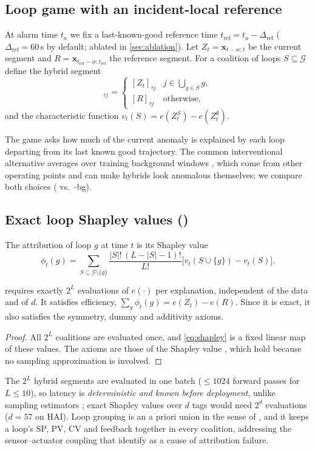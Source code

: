 \subsection{Loop game with an incident-local reference}
At alarm time $t_a$ we fix a last-known-good reference time $t_{\mathrm{ref}}=t_a-\Delta_{\mathrm{ref}}$ ($\Delta_{\mathrm{ref}}=60$\,s by default; ablated in \cref{sec:ablation}). Let $Z_t=\bm x_{t-w:t}$ be the current segment and $R=\bm x_{t_{\mathrm{ref}}-w:t_{\mathrm{ref}}}$ the reference segment. For a coalition of loops $S\subseteq\mathcal G$ define the hybrid segment
\begin{equation}
[Z_t^S]_{\tau j}=\begin{cases}[Z_t]_{\tau j}& j\in\bigcup_{g\in S}g,\\ [R]_{\tau j}&\text{otherwise,}\end{cases}
\end{equation}
and the characteristic function $v_t(S)=e(Z^S_t)-e(Z^\emptyset_t)$.

The game asks how much of the current anomaly is explained by each loop departing from its last known good trajectory. The common interventional alternative averages over training background windows \citep{lundberg2017shap,franco2026shats}, which come from other operating points and can make hybrids look anomalous themselves; we compare both choices (\LX{} vs.\ \LX-bg).

\subsection{Exact loop Shapley values (\LX)}
The attribution of loop $g$ at time $t$ is its Shapley value \citep{shapley1953value}
\begin{equation}\label{eq:shapley}
\phi_t(g)=\sum_{S\subseteq\mathcal G\setminus\{g\}}\frac{|S|!\,(L-|S|-1)!}{L!}\bigl[v_t(S\cup\{g\})-v_t(S)\bigr].
\end{equation}
\begin{proposition}\label{prop:cost}
\LX{} requires exactly $2^L$ evaluations of $e(\cdot)$ per explanation, independent of the data and of $d$. It satisfies efficiency, $\sum_g\phi_t(g)=e(Z_t)-e(R)$. Since it is exact, it also satisfies the symmetry, dummy and additivity axioms.
\end{proposition}
\begin{proof}
All $2^L$ coalitions are evaluated once, and \cref{eq:shapley} is a fixed linear map of these values. The axioms are those of the Shapley value \citep{shapley1953value}, which hold because no sampling approximation is involved.
\end{proof}
The $2^L$ hybrid segments are evaluated in one batch ($\le 1024$ forward passes for $L\le10$), so latency is \emph{deterministic and known before deployment}, unlike sampling estimators \citep{castro2009sampling,strumbelj2014explaining}; exact Shapley values over $d$ tags would need $2^d$ evaluations ($d=57$ on HAI). Loop grouping is an a priori union in the sense of \citet{owen1977unions}, and it keeps a loop's SP, PV, CV and feedback together in every coalition, addressing the sensor--actuator coupling that \citet{fung2024attributions} identify as a cause of attribution failure.

